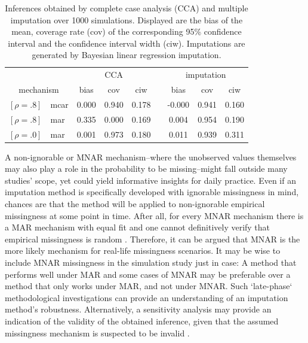 \documentclass[bimj,fleqn]{w-art}
\begin{document}
\begin{table}[t!]
\caption{Inferences obtained by complete case analysis (CCA) and multiple imputation over 1000 simulations. Displayed are the bias of the mean, coverage rate (cov) of the corresponding 95\% confidence interval and the confidence interval width (ciw). Imputations are generated by Bayesian linear regression imputation.}
\centering
\begin{tabular}{rlccccccc}
  \hline
 	& &\multicolumn{3}{c}{CCA} &&\multicolumn{3}{c}{imputation}	\\\cline{3-5}\cline{7-9}
 \multicolumn{2}{c}{mechanism}	& bias & cov & ciw && bias & cov & ciw \\ 
  \hline
$[\rho = .8]$ &mcar & 0.000 & 0.940 & 0.178 & & -0.000 & 0.941 & 0.160 \\ 
$[\rho = .8]$ &mar   & 0.335 & 0.000 & 0.169 & & 0.004 & 0.954 & 0.190 \\ 
$[\rho = .0]$ &mar   & 0.001 & 0.973 & 0.180 & & 0.011 & 0.939 & 0.311 \\ 
   \hline
\end{tabular}
\label{Tab}
\end{table}  




A non-ignorable or MNAR mechanism--where the unobserved values themselves may also play a role in the probability to be missing--might fall outside many studies' scope, yet could yield informative insights for daily practice. Even if an imputation method is specifically developed with ignorable missingness in mind, chances are that the method will be applied to non-ignorable empirical missingness at some point in time. After all, for every MNAR mechanism there is a MAR mechanism with equal fit and one cannot definitively verify that empirical missingness is random \citep{molenberghs2008every}. Therefore, it can be argued that MNAR is the more likely mechanism for real-life missingness scenarios. It may be wise to include MNAR missingness in the simulation study just in case: A method that performs well under MAR and some cases of MNAR may be preferable over a method that only works under MAR, and not under MNAR. Such `late-phase` methodological investigations \citep[see][]{hei22} can provide an understanding of an imputation method's robustness. Alternatively, a sensitivity analysis may provide an indication of the validity of the obtained inference, given that the assumed missingness mechanism is suspected to be invalid \citep[see e.g.][part 5]{molenberghs2014handbook}.
\end{document}
